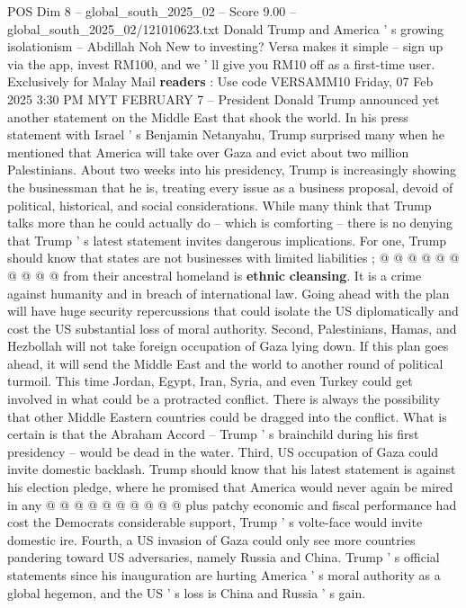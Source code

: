 \begin{textsample}{POS Dim 8 – global\_south\_2025\_02 – Score 9.00 – global\_south\_2025\_02/121010623.txt}  \label{ex:f8_pos_073}
Donald Trump and America ' s growing isolationism -- Abdillah Noh New to investing?
Versa makes it simple -- sign up via the app, invest RM100, and we ' ll give you RM10 off as a first-time user.
Exclusively for Malay Mail \textbf{readers} : Use code VERSAMM10 Friday, 07 Feb 2025 3:30 PM MYT FEBRUARY 7 -- President Donald Trump announced yet another statement on the Middle East that shook the world.
In his press statement with Israel ' s Benjamin Netanyahu, Trump surprised many when he mentioned that America will take over Gaza and evict about two million Palestinians.
About two weeks into his presidency, Trump is increasingly showing the businessman that he is, treating every issue as a business proposal, devoid of political, historical, and social considerations.
While many think that Trump talks more than he could actually do -- which is comforting -- there is no denying that Trump ' s latest statement invites dangerous implications.
For one, Trump should know that states are not businesses with limited liabilities ; @ @ @ @ @ @ @ @ @ @ from their ancestral homeland is \textbf{ethnic} \textbf{cleansing}.
It is a crime against humanity and in breach of international law.
Going ahead with the plan will have huge security repercussions that could isolate the US diplomatically and cost the US substantial loss of moral authority.
Second, Palestinians, Hamas, and Hezbollah will not take foreign occupation of Gaza lying down.
If this plan goes ahead, it will send the Middle East and the world to another round of political turmoil.
This time Jordan, Egypt, Iran, Syria, and even Turkey could get involved in what could be a protracted conflict.
There is always the possibility that other Middle Eastern countries could be dragged into the conflict.
What is certain is that the Abraham Accord -- Trump ' s brainchild during his first presidency -- would be dead in the water.
Third, US occupation of Gaza could invite domestic backlash.
Trump should know that his latest statement is against his election pledge, where he promised that America would never again be mired in any @ @ @ @ @ @ @ @ @ @ plus patchy economic and fiscal performance had cost the Democrats considerable support, Trump ' s volte-face would invite domestic ire.
Fourth, a US invasion of Gaza could only see more countries pandering toward US adversaries, namely Russia and China.
Trump ' s official statements since his inauguration are hurting America ' s moral authority as a global hegemon, and the US ' s loss is China and Russia ' s gain.

\end{textsample}
